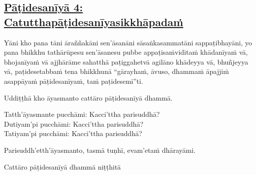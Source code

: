 \subsection*{\hyperref[ack4]{Pāṭidesanīyā 4: Catutthapāṭidesanīyasikkhāpadaṁ}}
\label{pd4}
Yāni kho pana tāni āraññakāni sen'āsanāni sāsaṅkasammatāni sappaṭibhayāni, yo pana bhikkhu tathārūpesu sen'āsanesu pubbe appaṭisaṁviditaṁ khādanīyaṁ vā, bhojanīyaṁ vā ajjhārāme sahatthā paṭiggahetvā agilāno khādeyya vā, bhuñjeyya vā, paṭidesetabbaṁ tena bhikkhunā “gārayhaṁ, āvuso, dhammaṁ āpajjiṁ asappāyaṁ pāṭidesanīyaṁ, taṁ paṭidesemī”ti.

\medskip

\begin{center}
Uddiṭṭhā kho āyasmanto cattāro pāṭidesanīyā dhammā.

\smallskip

Tatth'āyasmante pucchāmi: Kacci'ttha parisuddhā?\\
Dutiyam'pi pucchāmi: Kacci'ttha parisuddhā?\\
Tatiyam'pi pucchāmi: Kacci'ttha parisuddhā?

\smallskip

Parisuddh'etth'āyasmanto, tasmā tuṇhī, evam'etaṁ dhārayāmi.
\end{center}

\begin{outro}
  Cattāro pāṭidesanīyā dhammā niṭṭhitā
\end{outro}

\clearpage
